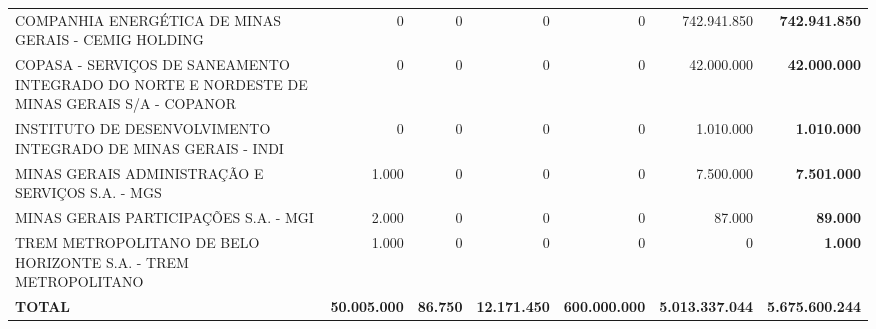 \documentclass{article}
\begin{document}
\begin{longtable}[c]{m{5cm}|m{2cm}|m{2cm}|m{2cm}|m{2cm}|m{2cm}|m{2cm}}
\multicolumn{1}{L{5cm}|}{COMPANHIA ENERGÉTICA DE MINAS GERAIS - CEMIG HOLDING} & \multicolumn{1}{r|}{         0} & \multicolumn{1}{r|}{     0} & \multicolumn{1}{r|}{         0} & \multicolumn{1}{r|}{          0} & \multicolumn{1}{r|}{742.941.850} & \multicolumn{1}{r}{ \textbf{742.941.850}} \\
\multicolumn{1}{L{5cm}|}{COPASA - SERVIÇOS DE SANEAMENTO INTEGRADO DO NORTE E NORDESTE DE MINAS GERAIS S/A - COPANOR} & \multicolumn{1}{r|}{         0} & \multicolumn{1}{r|}{     0} & \multicolumn{1}{r|}{         0} & \multicolumn{1}{r|}{          0} & \multicolumn{1}{r|}{42.000.000} & \multicolumn{1}{r}{ \textbf{42.000.000}} \\
\multicolumn{1}{L{5cm}|}{INSTITUTO DE DESENVOLVIMENTO INTEGRADO DE MINAS GERAIS - INDI} & \multicolumn{1}{r|}{         0} & \multicolumn{1}{r|}{     0} & \multicolumn{1}{r|}{         0} & \multicolumn{1}{r|}{          0} & \multicolumn{1}{r|}{1.010.000} & \multicolumn{1}{r}{ \textbf{1.010.000}} \\
\multicolumn{1}{L{5cm}|}{MINAS GERAIS ADMINISTRAÇÃO E SERVIÇOS S.A. - MGS} & \multicolumn{1}{r|}{1.000} & \multicolumn{1}{r|}{     0} & \multicolumn{1}{r|}{         0} & \multicolumn{1}{r|}{          0} & \multicolumn{1}{r|}{7.500.000} & \multicolumn{1}{r}{ \textbf{7.501.000}} \\
\multicolumn{1}{L{5cm}|}{MINAS GERAIS PARTICIPAÇÕES S.A. - MGI} & \multicolumn{1}{r|}{2.000} & \multicolumn{1}{r|}{     0} & \multicolumn{1}{r|}{         0} & \multicolumn{1}{r|}{          0} & \multicolumn{1}{r|}{87.000} & \multicolumn{1}{r}{ \textbf{89.000}} \\
\multicolumn{1}{L{5cm}|}{TREM METROPOLITANO DE BELO HORIZONTE S.A. - TREM METROPOLITANO} & \multicolumn{1}{r|}{1.000} & \multicolumn{1}{r|}{     0} & \multicolumn{1}{r|}{         0} & \multicolumn{1}{r|}{          0} & \multicolumn{1}{r|}{            0} & \multicolumn{1}{r}{ \textbf{1.000}} \\
\hline \hline
\multicolumn{1}{L{5cm}|}{ \textbf{TOTAL}} & \multicolumn{1}{r|}{ \textbf{50.005.000}} & \multicolumn{1}{r|}{ \textbf{86.750}} & \multicolumn{1}{r|}{ \textbf{12.171.450}} & \multicolumn{1}{r|}{ \textbf{600.000.000}} & \multicolumn{1}{r|}{ \textbf{5.013.337.044}} & \multicolumn{1}{r}{ \textbf{5.675.600.244}} \\\end{longtable}
\end{document}
